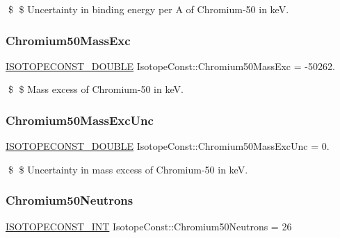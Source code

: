\$ \$ Uncertainty in binding energy per A of Chromium-\/50 in keV. \mbox{\label{group___isotope_const-_chromium-_cr50_ga03147e6a6c99332c834d051b560652e5}} 
\subsubsection{\texorpdfstring{Chromium50\+Mass\+Exc}{Chromium50MassExc}}
{\footnotesize\ttfamily \mbox{\hyperlink{group___isotope_const-_macros_ga8f45a7272ce02c0b4c65c44636ed719a}{I\+S\+O\+T\+O\+P\+E\+C\+O\+N\+S\+T\+\_\+\+D\+O\+U\+B\+LE}} Isotope\+Const\+::\+Chromium50\+Mass\+Exc = -\/50262.}

\$ \$ Mass excess of Chromium-\/50 in keV. \mbox{\label{group___isotope_const-_chromium-_cr50_ga91890ab7b1b5a1ab0ba02e632fb0caac}} 
\subsubsection{\texorpdfstring{Chromium50\+Mass\+Exc\+Unc}{Chromium50MassExcUnc}}
{\footnotesize\ttfamily \mbox{\hyperlink{group___isotope_const-_macros_ga8f45a7272ce02c0b4c65c44636ed719a}{I\+S\+O\+T\+O\+P\+E\+C\+O\+N\+S\+T\+\_\+\+D\+O\+U\+B\+LE}} Isotope\+Const\+::\+Chromium50\+Mass\+Exc\+Unc = 0.}

\$ \$ Uncertainty in mass excess of Chromium-\/50 in keV. \mbox{\label{group___isotope_const-_chromium-_cr50_ga4188d9867961a029dddeecce105b31ee}} 
\subsubsection{\texorpdfstring{Chromium50\+Neutrons}{Chromium50Neutrons}}
{\footnotesize\ttfamily \mbox{\hyperlink{group___isotope_const-_macros_ga5f18360b3e99483a35c32d789e62621c}{I\+S\+O\+T\+O\+P\+E\+C\+O\+N\+S\+T\+\_\+\+I\+NT}} Isotope\+Const\+::\+Chromium50\+Neutrons = 26}

